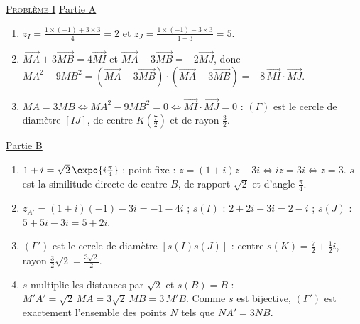 \begin{corrige}
\noindent \underline{\textsc{Probl\`eme I}} \newline
\underline{Partie A}
\begin{enumerate}
\item $z_I = \frac{1 \times (-1) + 3 \times 3}{4} = 2$ et $z_J = \frac{1 \times (-1) - 3 \times 3}{1 - 3} = 5$.
\item $\overrightarrow{MA} + 3\overrightarrow{MB} = 4\overrightarrow{MI}$ et $\overrightarrow{MA} - 3\overrightarrow{MB} = -2\overrightarrow{MJ}$, donc
      $MA^2 - 9MB^2 = (\overrightarrow{MA} - 3\overrightarrow{MB})\cdot(\overrightarrow{MA} + 3\overrightarrow{MB}) = -8\,\overrightarrow{MI}\cdot\overrightarrow{MJ}$.
\item $MA = 3MB \iff MA^2 - 9MB^2 = 0 \iff \overrightarrow{MI}\cdot\overrightarrow{MJ} = 0$ : $(\Gamma)$ est le cercle de diam\`etre $[IJ]$,
      de centre $K\left(\frac{7}{2}\right)$ et de rayon $\frac{3}{2}$.
\end{enumerate}
\underline{Partie B}
\begin{enumerate}
\item $1 + i = \sqrt{2}\,\expo{i\frac{\pi}{4}}$ ; point fixe : $z = (1 + i)z - 3i \iff iz = 3i \iff z = 3$. $s$ est la similitude directe de centre $B$,
      de rapport $\sqrt{2}$ et d'angle $\frac{\pi}{4}$.
\item $z_{A'} = (1 + i)(-1) - 3i = -1 - 4i$ ; $s(I)$ : $2 + 2i - 3i = 2 - i$ ; $s(J)$ : $5 + 5i - 3i = 5 + 2i$.
\item $(\Gamma')$ est le cercle de diam\`etre $[s(I)s(J)]$ : centre $s(K) = \frac{7}{2} + \frac{1}{2}i$, rayon $\frac{3}{2}\sqrt{2} = \frac{3\sqrt{2}}{2}$.
\item $s$ multiplie les distances par $\sqrt{2}$ et $s(B) = B$ : $M'A' = \sqrt{2}\,MA = 3\sqrt{2}\,MB = 3\,M'B$.
      Comme $s$ est bijective, $(\Gamma')$ est exactement l'ensemble des points $N$ tels que $NA' = 3NB$.
\end{enumerate}


\end{corrige}
